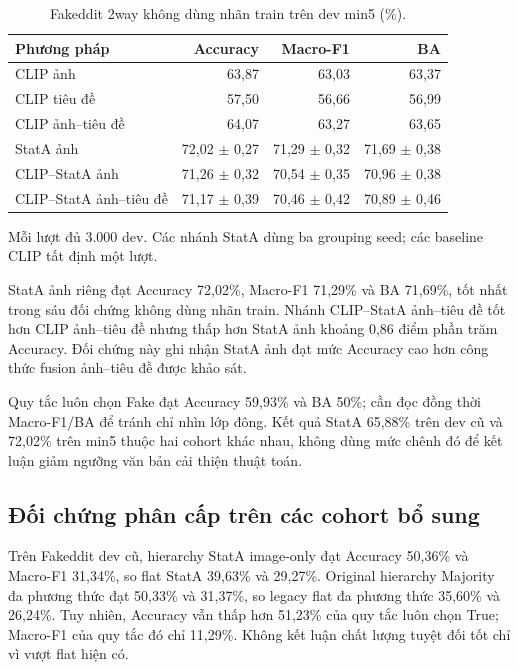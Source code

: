 \documentclass[12pt,a4paper]{article}
\newcommand{\BodySize}{13}
\newcommand{\BodyLeading}{15.6}
\newcommand{\BodyFont}{\fontsize{\BodySize}{\BodyLeading}\selectfont}
\numberwithin{figure}{section}
\numberwithin{table}{section}
\numberwithin{equation}{section}
\begin{document}
\begin{table}[H]

\centering
\BodyFont
\caption{Fakeddit 2way không dùng nhãn train trên dev min5 (\%).}
\begin{tabularx}{\linewidth}{@{}L r r r@{}}
\toprule
Phương pháp & Accuracy & Macro-F1 & BA\\
\midrule
CLIP ảnh & 63,87 & 63,03 & 63,37\\
CLIP tiêu đề & 57,50 & 56,66 & 56,99\\
CLIP ảnh--tiêu đề & 64,07 & 63,27 & 63,65\\
StatA ảnh & 72,02 $\pm$ 0,27 & 71,29 $\pm$ 0,32 & 71,69 $\pm$ 0,38\\
CLIP--StatA ảnh & 71,26 $\pm$ 0,32 & 70,54 $\pm$ 0,35 & 70,96 $\pm$ 0,38\\
CLIP--StatA ảnh--tiêu đề & 71,17 $\pm$ 0,39 & 70,46 $\pm$ 0,42 & 70,89 $\pm$ 0,46\\
\bottomrule
\end{tabularx}
\par\medskip
\begin{minipage}{\linewidth}
    \BodyFont
Mỗi lượt đủ 3.000 dev. Các nhánh StatA dùng ba grouping seed; các baseline CLIP tất định một lượt.
\end{minipage}

\end{table}

StatA ảnh riêng đạt Accuracy 72,02\%, Macro-F1 71,29\% và BA 71,69\%, tốt nhất trong sáu đối chứng
không dùng nhãn train. Nhánh CLIP--StatA ảnh--tiêu đề tốt hơn CLIP ảnh--tiêu đề nhưng thấp hơn StatA
ảnh khoảng 0,86 điểm phần trăm Accuracy. Đối chứng này ghi nhận StatA ảnh đạt mức Accuracy cao hơn công thức fusion ảnh--tiêu đề được khảo sát.

Quy tắc luôn chọn Fake đạt Accuracy 59,93\% và BA 50\%; cần đọc đồng thời Macro-F1/BA để tránh chỉ
nhìn lớp đông. Kết quả StatA 65,88\% trên dev cũ và 72,02\% trên min5 thuộc hai cohort khác nhau,
không dùng mức chênh đó để kết luận giảm ngưỡng văn bản cải thiện thuật toán.

\subsection{Đối chứng phân cấp trên các cohort bổ sung}

Trên Fakeddit dev cũ, hierarchy StatA image-only đạt Accuracy 50,36\% và Macro-F1 31,34\%, so flat
StatA 39,63\% và 29,27\%. Original hierarchy Majority đa phương thức đạt 50,33\% và 31,37\%, so
legacy flat đa phương thức 35,60\% và 26,24\%. Tuy nhiên, Accuracy vẫn thấp hơn 51,23\% của quy tắc
luôn chọn True; Macro-F1 của quy tắc đó chỉ 11,29\%. Không kết luận chất lượng tuyệt đối tốt chỉ vì
vượt flat hiện có.
\end{document}
